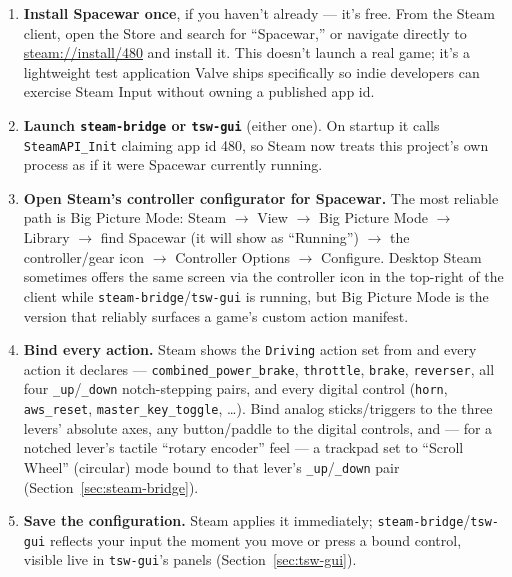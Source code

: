 \documentclass[11pt,a4paper]{article}
\newcommand{\code}[1]{\texttt{#1}}
\begin{document}
\begin{enumerate}[leftmargin=1.5em]
    \item \textbf{Install Spacewar once}, if you haven't already --- it's
    free. From the Steam client, open the Store and search for
    ``Spacewar,'' or navigate directly to \url{steam://install/480} and
    install it. This doesn't launch a real game; it's a lightweight test
    application Valve ships specifically so indie developers can exercise
    Steam Input without owning a published app id.
    \item \textbf{Launch \code{steam-bridge} or \code{tsw-gui}} (either
    one). On startup it calls \code{SteamAPI\_Init} claiming app id 480,
    so Steam now treats this project's own process as if it were Spacewar
    currently running.
    \item \textbf{Open Steam's controller configurator for Spacewar.} The
    most reliable path is Big Picture Mode: Steam
    $\rightarrow$ View $\rightarrow$ Big Picture Mode $\rightarrow$
    Library $\rightarrow$ find Spacewar (it will show as ``Running'')
    $\rightarrow$ the controller/gear icon $\rightarrow$ Controller
    Options $\rightarrow$ Configure. Desktop Steam sometimes offers the
    same screen via the controller icon in the top-right of the client
    while \code{steam-bridge}/\code{tsw-gui} is running, but Big Picture
    Mode is the version that reliably surfaces a game's custom action
    manifest.
    \item \textbf{Bind every action.} Steam shows the \code{Driving}
    action set from  and every action
    it declares --- \code{combined\_power\_brake}, \code{throttle},
    \code{brake}, \code{reverser}, all four \code{\_up}/\code{\_down}
    notch-stepping pairs, and every digital control (\code{horn},
    \code{aws\_reset}, \code{master\_key\_toggle}, \ldots). Bind analog
    sticks/triggers to the three levers' absolute axes, any button/paddle
    to the digital controls, and --- for a notched lever's tactile
    ``rotary encoder'' feel --- a trackpad set to ``Scroll Wheel''
    (circular) mode bound to that lever's \code{\_up}/\code{\_down} pair
    (Section~\ref{sec:steam-bridge}).
    \item \textbf{Save the configuration.} Steam applies it immediately;
    \code{steam-bridge}/\code{tsw-gui} reflects your input the moment you
    move or press a bound control, visible live in \code{tsw-gui}'s
    panels (Section~\ref{sec:tsw-gui}).
\end{enumerate}
\end{document}
